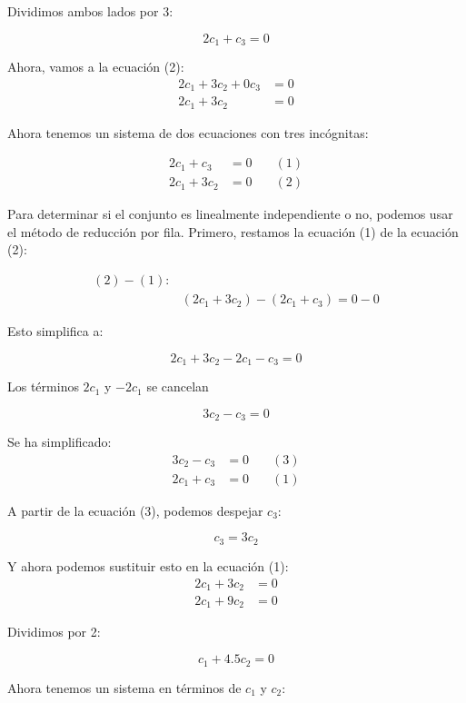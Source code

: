 \begin{itemize}
    Dividimos ambos lados por 3:

    \[
        2c_1 + c_3 = 0
    \]

    Ahora, vamos a la ecuación (2):
    \begin{align*}
        2c_1 + 3c_2 + 0c_3 & = 0 \\
        2c_1 + 3c_2        & = 0
    \end{align*}

    Ahora tenemos un sistema de dos ecuaciones con tres incógnitas:

    \begin{align*}
        2c_1  + c_3 &= 0 \quad &(1) \\
        2c_1 + 3c_2 &= 0 \quad &(2)
    \end{align*}


    Para determinar si el conjunto es linealmente independiente o no, podemos usar el método de reducción por fila. Primero, restamos la ecuación (1) de la ecuación (2):
    
    \begin{align*}
        (2) - (1): & \\
        & (2c_1 + 3c_2) - (2c_1 + c_3) = 0 - 0
    \end{align*}

    Esto simplifica a:

    \[
        2c_1 + 3c_2 - 2c_1 - c_3 = 0
    \]

    Los términos $2c_1$ y $-2c_1$ se cancelan

    \[
        3c_2 - c_3 = 0
    \]

    Se ha simplificado:
    \begin{align*}
        3c_2 - c_3 &= 0 \quad &(3) \\
        2c_1 + c_3 &= 0 \quad &(1)
    \end{align*}

    A partir de la ecuación (3), podemos despejar $c_3$:

    \[
        c_3 = 3c_2
    \]

    Y ahora podemos sustituir esto en la ecuación (1):
    \begin{align*}
        2c_1 + 3c_2 & = 0 \\
        2c_1 + 9c_2 & = 0
    \end{align*}
    
    Dividimos por 2:

    \[
        c_1 + 4.5c_2 = 0
    \]

    Ahora tenemos un sistema en términos de $c_1$ y $c_2$:


\end{itemize}
